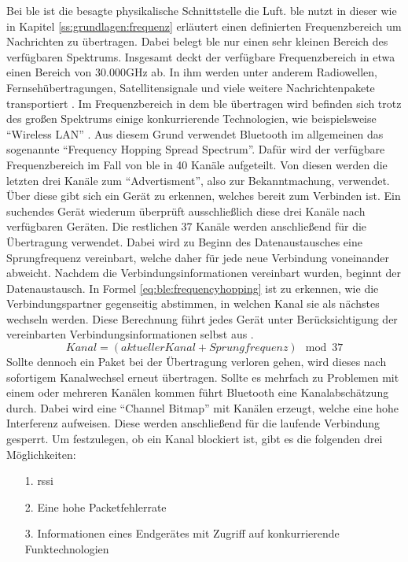 \noindent Bei \ac{ble} ist die besagte physikalische Schnittstelle die Luft. \ac{ble} nutzt in dieser wie in Kapitel \ref{ss:grundlagen:frequenz} erläutert einen definierten Frequenzbereich um Nachrichten zu übertragen. Dabei belegt \ac{ble} nur einen sehr kleinen Bereich des verfügbaren Spektrums. Insgesamt deckt der verfügbare Frequenzbereich in etwa einen Bereich von 30.000GHz ab. In ihm werden unter anderem Radiowellen, Fernsehübertragungen, Satellitensignale und viele weitere Nachrichtenpakete transportiert \cite[Seite 107]{Tanenbaum14:CN}. Im Frequenzbereich in dem \ac{ble} übertragen wird befinden sich trotz des großen Spektrums einige konkurrierende Technologien, wie beispielsweise "`Wireless LAN"' \cite[Seite 17]{Townsend14:GSB}. Aus diesem Grund verwendet Bluetooth im allgemeinen das sogenannte "`Frequency Hopping Spread Spectrum"'. Dafür wird der verfügbare Frequenzbereich im Fall von \ac{ble} in 40 Kanäle aufgeteilt. Von diesen werden die letzten drei Kanäle zum "`Advertisment"', also zur Bekanntmachung, verwendet. Über diese gibt sich ein Gerät zu erkennen, welches bereit zum Verbinden ist. Ein suchendes Gerät wiederum überprüft ausschließlich diese drei Kanäle nach verfügbaren Geräten. Die restlichen 37 Kanäle werden anschließend für die Übertragung verwendet. Dabei wird zu Beginn des Datenaustausches eine Sprungfrequenz vereinbart, welche daher für jede neue Verbindung voneinander abweicht. Nachdem die Verbindungsinformationen vereinbart wurden, beginnt der Datenaustausch. In Formel \ref{eq:ble:frequencyhopping} ist zu erkennen, wie die Verbindungspartner gegenseitig abstimmen, in welchen Kanal sie als nächstes wechseln werden. Diese Berechnung führt jedes Gerät unter Berücksichtigung der vereinbarten Verbindungsinformationen selbst aus \cite[Seite 17]{Townsend14:GSB}. 
\begin{equation}
\label{eq:ble:frequencyhopping}
Kanal = (aktueller Kanal + Sprungfrequenz) \mod 37
\end{equation}
Sollte dennoch ein Paket bei der Übertragung verloren gehen, wird dieses nach sofortigem Kanalwechsel erneut übertragen. Sollte es mehrfach zu Problemen mit einem oder mehreren Kanälen kommen führt Bluetooth eine Kanalabschätzung durch. Dabei wird eine "`Channel Bitmap"' mit Kanälen erzeugt, welche eine hohe Interferenz aufweisen. Diese werden anschließend für die laufende Verbindung gesperrt. Um festzulegen, ob ein Kanal blockiert ist, gibt es die folgenden drei Möglichkeiten:

\begin{itemize}
	\item[1.]{\ac{rssi}}
	\item[2.]{Eine hohe Packetfehlerrate}
	\item[3.]{Informationen eines Endgerätes mit Zugriff auf konkurrierende Funktechnologien}
\end{itemize}       


